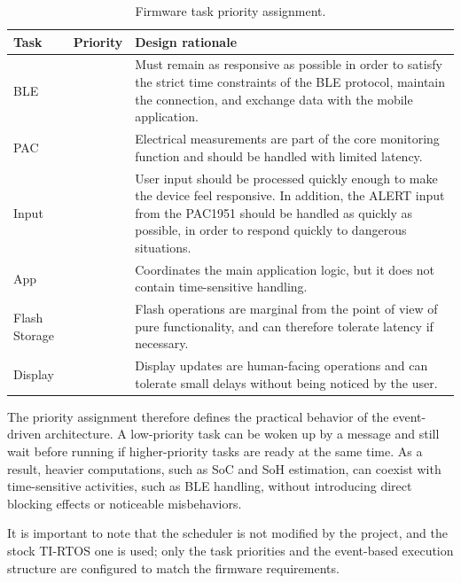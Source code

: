 \begin{table}[H]
	\centering
	\small
	\setlength{\tabcolsep}{4pt}
	\renewcommand{\arraystretch}{1.25}
	\caption{Firmware task priority assignment.}
	\label{tab:task_priorities}
	\begin{tabularx}{\textwidth}{
			@{}
			>{\raggedright\arraybackslash}p{2.3cm}
			>{\centering\arraybackslash}p{1.5cm}
			>{\raggedright\arraybackslash}X
			@{}
		}
		\toprule
		\textbf{Task} &
		\textbf{Priority} &
		\textbf{Design rationale}
		\tabularnewline
		\midrule
		
		BLE & 3 &
		Must remain as responsive as possible in order to satisfy the strict time constraints of the BLE protocol, maintain the connection, and exchange data with the mobile application.
		\tabularnewline
		
		PAC & 2 &
		Electrical measurements are part of the core monitoring function and should be handled with limited latency.
		\tabularnewline
		
		Input &	2 &
		User input should be processed quickly enough to make the device feel responsive. In addition, the ALERT input from the PAC1951 should be handled as quickly as possible, in order to respond quickly to dangerous situations.
		\tabularnewline
		
		App & 1 &
		Coordinates the main application logic, but it does not contain time-sensitive handling.
		\tabularnewline
		
		Flash Storage & 1 &
		Flash operations are marginal from the point of view of pure functionality, and can therefore tolerate latency if necessary.
		\tabularnewline
		
		Display & 1 &
		Display updates are human-facing operations and can tolerate small delays without being noticed by the user.
		\tabularnewline
		\bottomrule
	\end{tabularx}
	
\end{table}

The priority assignment therefore defines the practical behavior of the event-driven architecture. A low-priority task can be woken up by a message and still wait before running if higher-priority tasks are ready at the same time. As a result, heavier computations, such as SoC and SoH estimation, can coexist with time-sensitive activities, such as BLE handling, without introducing direct blocking effects or noticeable misbehaviors.

It is important to note that the scheduler is not modified by the project, and the stock TI-RTOS one is used; only the task priorities and the event-based execution structure are configured to match the firmware requirements.


